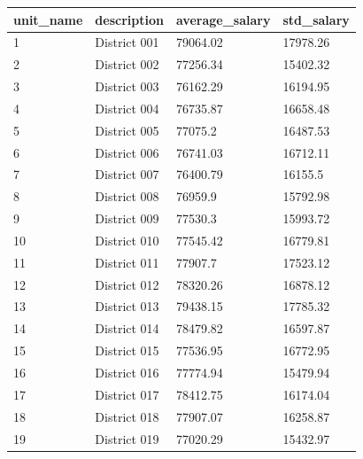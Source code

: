 \documentclass{article}
\begin{document}
\begin{table}[h]
\begin{tabular}{|l|l|l|l|}
\hline
unit\_name & description                             & average\_salary & std\_salary \\
\hline
1          & District 001                            & 79064.02        & 17978.26    \\
2          & District 002                            & 77256.34        & 15402.32    \\
3          & District 003                            & 76162.29        & 16194.95    \\
4          & District 004                            & 76735.87        & 16658.48    \\
5          & District 005                            & 77075.2         & 16487.53    \\
6          & District 006                            & 76741.03        & 16712.11    \\
7          & District 007                            & 76400.79        & 16155.5     \\
8          & District 008                            & 76959.9         & 15792.98    \\
9          & District 009                            & 77530.3         & 15993.72    \\
10         & District 010                            & 77545.42        & 16779.81    \\
11         & District 011                            & 77907.7         & 17523.12    \\
12         & District 012                            & 78320.26        & 16878.12    \\
13         & District 013                            & 79438.15        & 17785.32    \\
14         & District 014                            & 78479.82        & 16597.87    \\
15         & District 015                            & 77536.95        & 16772.95    \\
16         & District 016                            & 77774.94        & 15479.94    \\
17         & District 017                            & 78412.75        & 16174.04    \\
18         & District 018                            & 77907.07        & 16258.87    \\
19         & District 019                            & 77020.29        & 15432.97    \\

\end{tabular}
\end{table}
\end{document}
